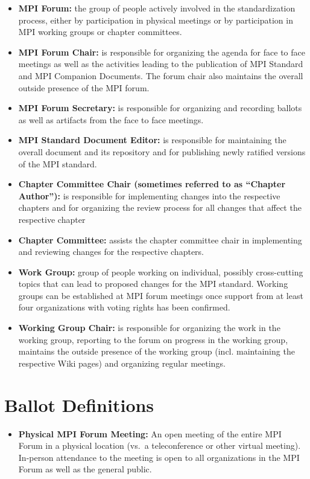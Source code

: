 {{\begin{itemize}
\item {\bf MPI Forum:} the group of people actively involved in the standardization process, either by participation in physical meetings or by participation in MPI working groups or chapter committees.
\item {\bf MPI Forum Chair:} is responsible for organizing the agenda for face to face meetings as well as the activities leading to the publication of MPI Standard and MPI Companion Documents. The forum chair also maintains the overall outside presence of the MPI forum.
\item {\bf MPI Forum Secretary:} is responsible for organizing and recording ballots as well as artifacts from the face to face meetings. 
\item {\bf MPI Standard Document Editor:} is responsible for maintaining the overall document and its repository and for publishing newly ratified versions of the MPI standard.
\item {\bf Chapter Committee Chair (sometimes referred to as ``Chapter
  Author''):} is responsible for implementing changes into the respective chapters and for organizing the review process for all changes that affect the respective chapter
\item {\bf Chapter Committee:} assists the chapter committee chair in implementing and reviewing changes for the respective chapters.
\item {\bf Work Group:} group of people working on individual, possibly cross-cutting topics that can lead to proposed changes for the MPI standard. Working groups can be established at MPI forum meetings once support from at least four organizations with voting rights has been confirmed.
\item {\bf Working Group Chair:} is responsible for organizing the work in the working group, reporting to the forum on progress in the working group, maintains the outside presence of the working group (incl. maintaining the respective Wiki pages) and organizing regular meetings.
\end{itemize}

\section{Ballot Definitions}

\begin{itemize}
\item {\bf Physical MPI Forum Meeting:} An open meeting of the entire
  MPI Forum in a physical location (vs.\ a teleconference or other
  virtual meeting).  In-person attendance to the meeting is open to
  all organizations in the MPI Forum as well as the general public.


\end{itemize}}}
